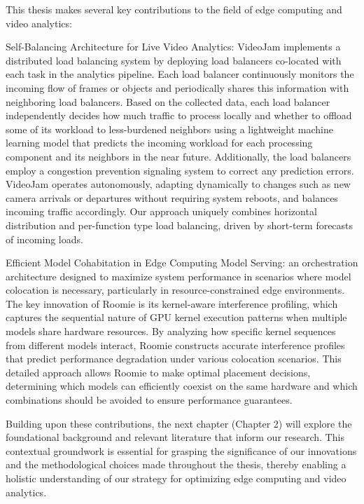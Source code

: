 This thesis makes several key contributions to the field of edge computing and video analytics:

Self-Balancing Architecture for Live Video Analytics: VideoJam implements a distributed load balancing system by deploying load balancers co-located with each task in the analytics pipeline. Each load balancer continuously monitors the incoming flow of frames or objects and periodically shares this information with neighboring load balancers. Based on the collected data, each load balancer independently decides how much traffic to process locally and whether to offload some of its workload to less-burdened neighbors using a lightweight machine learning model that predicts the incoming workload for each processing component and its neighbors in the near future. Additionally, the load balancers employ a congestion prevention signaling system to correct any prediction errors. VideoJam operates autonomously, adapting dynamically to changes such as new camera arrivals or departures without requiring system reboots, and balances incoming traffic accordingly. Our approach uniquely combines horizontal distribution and per-function type load balancing, driven by short-term forecasts of incoming loads.

Efficient Model Cohabitation in Edge Computing Model Serving: an orchestration architecture designed to maximize system performance in scenarios where model colocation is necessary, particularly in resource-constrained edge environments. The key innovation of Roomie is its kernel-aware interference profiling, which captures the sequential nature of GPU kernel execution patterns when multiple models share hardware resources. By analyzing how specific kernel sequences from different models interact, Roomie constructs accurate interference profiles that predict performance degradation under various colocation scenarios. This detailed approach allows Roomie to make optimal placement decisions, determining which models can efficiently coexist on the same hardware and which combinations should be avoided to ensure performance guarantees.

Building upon these contributions, the next chapter (Chapter 2) will explore the foundational background and relevant literature that inform our research. This contextual groundwork is essential for grasping the significance of our innovations and the methodological choices made throughout the thesis, thereby enabling a holistic understanding of our strategy for optimizing edge computing and video analytics.